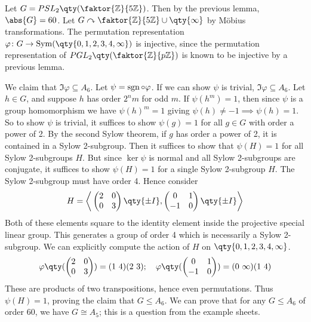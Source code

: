 \begin{example}
	Let $G = PSL_2\qty(\faktor{\mathbb Z}{5\mathbb Z})$.
	Then by the previous lemma, $\abs{G} = 60$.
	Let $G \acts \faktor{\mathbb Z}{5\mathbb Z} \cup \qty{\infty}$ by M\"obius transformations.
	The permutation representation $\varphi \colon G \to \Sym(\qty{0,1,2,3,4,\infty})$ is injective, since the permutation representation of $PGL_2\qty(\faktor{\mathbb Z}{p\mathbb Z})$ is known to be injective by a previous lemma.

	We claim that $\Im \varphi \subseteq A_6$.
	Let $\psi = \operatorname{sgn} \circ \varphi$.
	If we can show $\psi$ is trivial, $\Im \varphi \subseteq A_6$.
	Let $h\in G$, and suppose $h$ has order $2^n m$ for odd $m$.
	If $\psi(h^m) = 1$, then since $\psi$ is a group homomorphism we have $\psi(h)^m = 1$ giving $\psi(h) \neq -1 \implies \psi(h) = 1$.
	So to show $\psi$ is trivial, it suffices to show $\psi(g) = 1$ for all $g \in G$ with order a power of 2.
	By the second Sylow theorem, if $g$ has order a power of 2, it is contained in a Sylow 2-subgroup.
	Then it suffices to show that $\psi(H) = 1$ for all Sylow 2-subgroups $H$.
	But since $\ker \psi$ is normal and all Sylow 2-subgroups are conjugate, it suffices to show $\psi(H) = 1$ for a single Sylow 2-subgroup $H$.
	The Sylow 2-subgroup must have order 4.
	Hence consider
	\begin{align*}
		H = \genset{ \begin{pmatrix}
				2 & 0 \\
				0 & 3
			\end{pmatrix} \qty{\pm I}, \begin{pmatrix}
				0  & 1 \\
				-1 & 0
			\end{pmatrix} \qty{\pm I} }
	\end{align*}
	Both of these elements square to the identity element inside the projective special linear group.
	This generates a group of order 4 which is necessarily a Sylow 2-subgroup.
	We can explicitly compute the action of $H$ on $\qty{0,1,2,3,4,\infty}$.
	\begin{align*}
		\varphi\qty(\begin{pmatrix}
				2 & 0 \\
				0 & 3
			\end{pmatrix}) = (1\ 4)(2\ 3);\quad \varphi\qty(\begin{pmatrix}
				0  & 1 \\
				-1 & 0
			\end{pmatrix}) = (0\ \infty)(1\ 4)
	\end{align*}
	These are products of two transpositions, hence even permutations.
	Thus $\psi(H) = 1$, proving the claim that $G \leq A_6$.
	We can prove that for any $G \leq A_6$ of order 60, we have $G \cong A_5$; this is a question from the example sheets.
\end{example}

